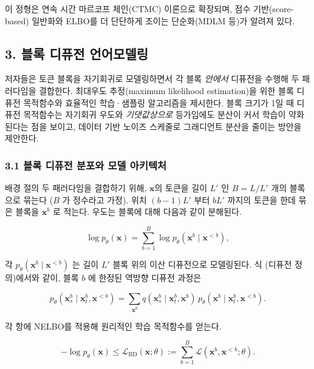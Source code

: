 \documentclass[
]{article}
\begin{document}
이 정형은 연속 시간 마르코프 체인(CTMC) 이론으로 확장되며, 점수
기반(score-based) 일반화와 ELBO를 더 단단하게 조이는 단순화(MDLM 등)가
알려져 있다.

\hypertarget{uxbe14uxb85d-uxb514uxd4e8uxc804-uxc5b8uxc5b4uxbaa8uxb378uxb9c1}{%
\subsection{3. 블록 디퓨전
언어모델링}\label{uxbe14uxb85d-uxb514uxd4e8uxc804-uxc5b8uxc5b4uxbaa8uxb378uxb9c1}}

저자들은 토큰 블록을 자기회귀로 모델링하면서 각 블록 \emph{안에서}
디퓨전을 수행해 두 패러다임을 결합한다. 최대우도 추정(maximum likelihood
estimation)을 위한 블록 디퓨전 목적함수와 효율적인 학습·샘플링
알고리즘을 제시한다. 블록 크기가 1일 때 디퓨전 목적함수는 자기회귀
우도와 \emph{기댓값상으로} 등가임에도 분산이 커서 학습이 약화된다는 점을
보이고, 데이터 기반 노이즈 스케줄로 그래디언트 분산을 줄이는 방안을
제안한다.

\hypertarget{uxbe14uxb85d-uxb514uxd4e8uxc804-uxbd84uxd3ecuxc640-uxbaa8uxb378-uxc544uxd0a4uxd14duxcc98}{%
\subsubsection{3.1 블록 디퓨전 분포와 모델
아키텍처}\label{uxbe14uxb85d-uxb514uxd4e8uxc804-uxbd84uxd3ecuxc640-uxbaa8uxb378-uxc544uxd0a4uxd14duxcc98}}

배경 절의 두 패러다임을 결합하기 위해, \(\mathbf{x}\)의 토큰을 길이
\(L'\) 인 \(B = L/L'\) 개의 블록으로 묶는다 (\(B\) 가 정수라고 가정).
위치 \((b-1)L'\) 부터 \(bL'\) 까지의 토큰을 한데 묶은 블록을
\(\mathbf{x}^b\) 로 적는다. 우도는 블록에 대해 다음과 같이 분해된다.

\[
\log p_\theta(\mathbf{x}) = \sum_{b=1}^{B} \log p_\theta(\mathbf{x}^b \mid \mathbf{x}^{< b}),
\]

각 \(p_\theta(\mathbf{x}^b \mid \mathbf{x}^{< b})\) 는 길이 \(L'\)
블록 위의 이산 디퓨전으로 모델링된다. 식 (디퓨전 정의)에서와 같이, 블록
\(b\) 에 한정된 역방향 디퓨전 과정은

\[
p_\theta(\mathbf{x}^b_s \mid \mathbf{x}^b_t, \mathbf{x}^{< b}) = \sum_{\mathbf{x}^b} q(\mathbf{x}^b_s \mid \mathbf{x}^b_t, \mathbf{x}^b)\, p_\theta(\mathbf{x}^b \mid \mathbf{x}^b_t, \mathbf{x}^{< b}).
\]

각 항에 NELBO를 적용해 원리적인 학습 목적함수를 얻는다.

\[
-\log p_\theta(\mathbf{x}) \le \mathcal{L}_\text{BD}(\mathbf{x}; \theta) := \sum_{b=1}^{B} \mathcal{L}(\mathbf{x}^b, \mathbf{x}^{< b}; \theta).
\]
\end{document}
